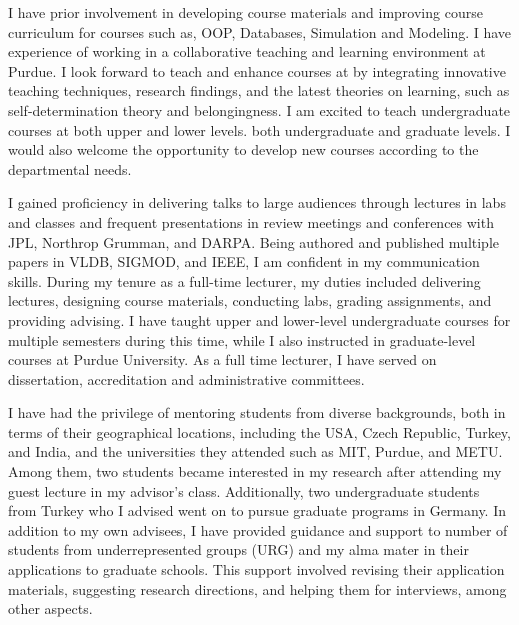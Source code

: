 \documentclass[10pt]{article}
\renewcommand*\paragraph[1]{}
\begin{document}
I have prior involvement in developing course materials and improving course curriculum for courses such as, OOP, Databases, Simulation and Modeling.
I have experience of working in a collaborative teaching and learning environment at Purdue.
I look forward to teach and enhance courses at \InstitutionName{} by integrating innovative teaching techniques, research findings, and the latest theories on learning, such as self-determination theory and belongingness. I am excited to teach 
\ifx\degreeLevel\undefined 
undergraduate
\fi
courses at 
\ifx\degreeLevel\undefined 
both upper and lower levels.
\else
both undergraduate and graduate levels.
\fi
I would also welcome the opportunity to develop new courses according to the departmental needs.

\paragraph{4) Good communication skills.}
I gained proficiency in delivering talks to large audiences through lectures in labs and classes and frequent presentations in review meetings and conferences with JPL, Northrop Grumman, and DARPA. Being authored and published multiple papers in VLDB, SIGMOD, and IEEE, I am confident in my communication skills. During my tenure as a full-time lecturer, my duties included delivering lectures, designing course materials, conducting labs, grading assignments, and providing advising. I have taught upper and lower-level undergraduate courses for multiple semesters during this time, while I also instructed in graduate-level courses at Purdue University. As a full time lecturer, I have served on dissertation, accreditation and administrative committees.


I have had the privilege of mentoring students from diverse backgrounds, both in terms of their geographical locations, including the USA, Czech Republic, Turkey, and India, and the universities they attended such as MIT, Purdue, and METU. Among them, two students became interested in my research after attending my guest lecture in my advisor's class. Additionally, two undergraduate students from Turkey who I advised went on to pursue graduate programs in Germany. In addition to my own advisees, I have provided guidance and support to number of students from underrepresented groups (URG) and my alma mater in their applications to graduate schools. This support involved revising their application materials, suggesting research directions, and helping them for interviews, among other aspects. 
\end{document}
